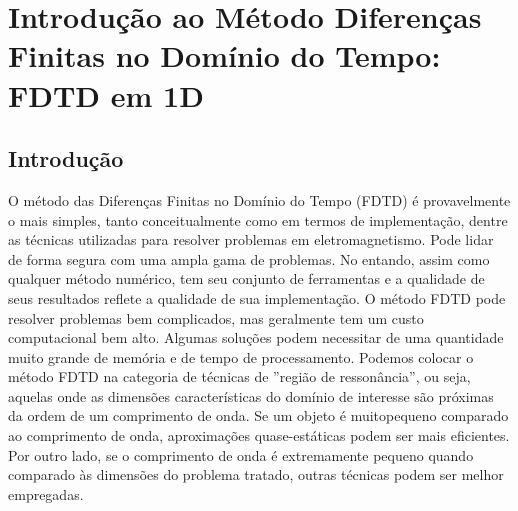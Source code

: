 \chapter[Introdução ao Método FDTD]{Introdução ao 
Método Diferenças Finitas no Domínio do Tempo: FDTD em 1D
\label{chap:fdtdIntro}} 


\renewcommand{\thefootnote}{\fnsymbol{footnote}}

\section{Introdução}

O método das Diferenças Finitas no Domínio do Tempo (FDTD) é provavelmente 
o mais simples, tanto conceitualmente como em termos de implementação, dentre 
as técnicas utilizadas para resolver problemas em eletromagnetismo. Pode 
lidar de forma segura com uma ampla gama de problemas.  No entando, assim como qualquer 
método numérico, tem seu conjunto de ferramentas e a
qualidade de seus resultados reflete a qualidade de sua implementação. O método FDTD pode 
resolver problemas bem complicados, mas geralmente tem um custo computacional 
bem alto. Algumas soluções podem necessitar de uma quantidade muito grande de memória e
de tempo de processamento. Podemos colocar o método FDTD na categoria de técnicas 
de ''região de ressonância'', ou seja, aquelas onde as dimensões características 
do domínio de interesse são próximas da ordem de um comprimento de onda. Se um objeto 
é muitopequeno comparado ao comprimento de onda, aproximações quase-estáticas podem 
ser mais eficientes. Por outro lado, se o comprimento de onda é extremamente 
pequeno quando comparado às dimensões do problema tratado, 
outras técnicas podem ser melhor empregadas.

